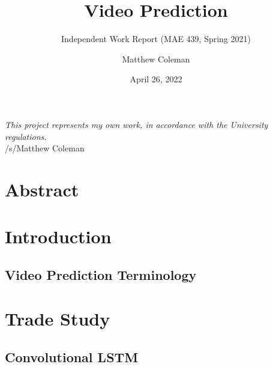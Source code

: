 \documentclass{scrartcl}
\title{Video Prediction}
\subtitle{Independent Work Report (MAE 439, Spring 2021)}
\author{Matthew Coleman}
\date{April 26, 2022}
\begin{document}
\maketitle

\vspace{8cm}
\Large
\textit{This project represents my own work, in accordance with the University regulations.} \\
\hspace*{\fill} \large /s/Matthew Coleman
\normalsize

\newpage
\tableofcontents
\newpage

\section{Abstract}
\label{sec:abstract}

\section{Introduction}
\label{sec:intro}

\subsection{Video Prediction Terminology}
\label{subsec:intro_terminology}

\newpage
\section{Trade Study}
\label{sec:related-work}

\subsection{Convolutional LSTM}
\label{subsec:conv_lstm}

\newpage
\section{}
\label{}

\newpage
\section{}
\label{}

\newpage
\section{}
\label{}

\newpage
\section{}
\label{}



\newpage

\newpage
\end{document}
